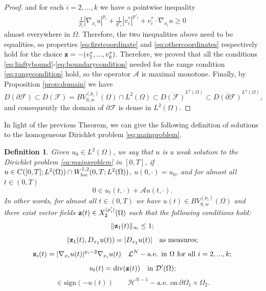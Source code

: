 \documentclass[reqno,12pt]{amsart}
\def\z{{\bf z}}
\newtheorem{definition}[theorem]{Definition}
\numberwithin{equation}{section}
\begin{document}
\begin{proof}
and for each $i = 2,...,k$ we have a pointwise inequality
\begin{align}
\frac{1}{p_i} |\nabla_{x_i} u|^{p_i} + \frac{1}{p'_i} |v_i^*|^{p'_i} + v_i^* \cdot \nabla_{x_i} u \geq 0
\end{align}
almost everywhere in $\Omega$. Therefore, the two inequalities above need to be equalities, so properties \eqref{eq:firstcoordinate} and \eqref{eq:othercoordinates} respectively hold for the choice $\z = -(v_1^*,...,v_k^*)$. Therefore, we proved that all the conditions \eqref{eq:linftybound}-\eqref{eq:boundarycondition} needed for the range condition \eqref{eq:rangecondition} hold, so the operator $\mathcal{A}$ is maximal monotone. Finally, by Proposition \ref{prop:domain} we have
$$ D(\partial \mathcal{F}) \subset  D(\mathcal{F}) =  BV_{0,w}^{(p_i)}(\Omega) \cap L^2(\Omega) \subset \overline{D(\mathcal{F})}^{L^2(\Omega)} \subset \overline{D(\partial \mathcal{F})}^{L^2(\Omega)},$$
and consequently the domain of $\partial \mathcal{F}$ is dense in $L^2(\Omega)$.
\end{proof}

In light of the previous Theorem, we can give the following definition of solutions to the homogeneous Dirichlet problem \eqref{eq:mainproblem}.

\begin{definition}\label{def:dirichlet1p}
{\rm Given $u_0 \in L^2(\Omega)$, we say that $u$ is a {\it weak solution} to the Dirichlet problem \eqref{eq:mainproblem} in $[0,T]$, if $u \in C([0,T]; L^2(\Omega)) \cap W_{\rm loc}^{1,2}(0, T; L^2(\Omega))$,   $u(0, \cdot) =u_0$, and for almost all $t \in (0,T)$
\begin{equation}\label{def:dirichletflow}
0 \in u_t(t, \cdot) + \mathcal{A} u(t, \cdot).
\end{equation}
In other words, for almost all $t \in (0,T)$ we have $u(t) \in BV_{0,w}^{(p_i)}(\Omega)$ and there exist vector fields $\z(t) \in X_2^{(p'_i)}(\Omega)$ such that the following conditions hold:
\begin{equation}
\| \z_1(t) \|_\infty \leq 1;
\end{equation}
\begin{equation}
(\z_1(t), D_{x_1} u(t)) = |D_{x_1} u(t)| \quad \hbox{as measures};
\end{equation}
\begin{equation}
\z_i(t) = |\nabla_{x_i} u(t)|^{p_i - 2} \nabla_{x_i} u(t) \quad \mathcal{L}^N-\hbox{a.e. in } \Omega \hbox{ for all } i = 2,...,k;
\end{equation}
\begin{equation}  
u_t(t) = \mathrm{div}(\z(t))\quad  \hbox{in} \ \mathcal{D}^\prime(\Omega);
\end{equation}
\begin{equation}
[\z_1(t), \nu_{x_1}] \in \mathrm{sign}(-u(t)) \qquad  \mathcal{H}^{N-1}-\mbox{a.e.  on} \ \partial \Omega_1 \times \Omega_2.
\end{equation}
}
\end{definition}
\end{document}
